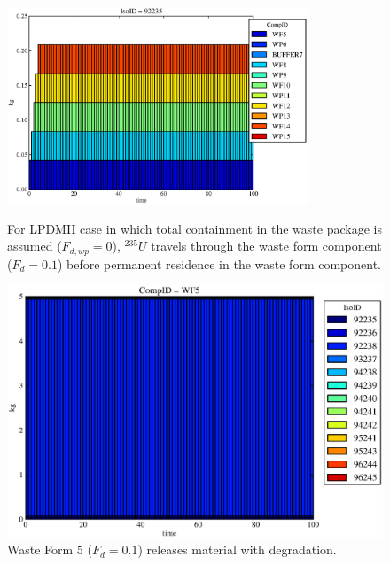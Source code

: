 \begin{figure}[ht]
\centering
\includegraphics[width=0.8\textwidth]{./chapters/demonstration/base/lpDMII.eps}
\caption[$^{235}U$ residence. Lumped Parameter  DM Waste Package No Release.]{
For LPDMII case in which total containment in the waste package is assumed 
($F_{d,wp}=0$), $^{235}U$ travels through the waste form component ($F_d = 0.1$) before 
permanent residence in the waste form component.
}
\label{fig:lpDMIIall}
\begin{minipage}[b]{0.45\linewidth}

  \includegraphics[width=\textwidth]{./chapters/demonstration/base/lpDMII1.eps}
  \caption[LPDMII Waste Form Contaminants.]{
    Waste Form 5 ($F_d = 0.1$) releases material with degradation. 
    }
  \label{fig:lpDMIIwf5}
  

\end{minipage}
\end{figure}
